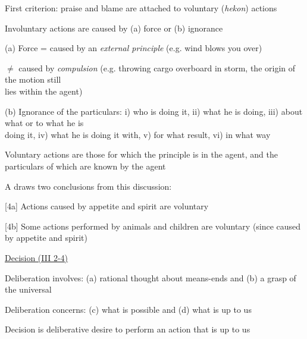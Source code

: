 \documentclass[11pt]{article}
\begin{document}
\noindent [1] First criterion: praise and blame are attached to voluntary (\emph{hekon}) actions
\vspace*{1mm}

\noindent [2] Involuntary actions are caused by (a) force or (b) ignorance
\vspace*{1mm}

(a) Force = caused by an \emph{external principle} (e.g. wind blows you over)
\vspace*{1mm}

\hspace*{14.5mm}$\neq$ caused by \emph{compulsion} (e.g. throwing cargo overboard in storm, the origin of the motion still\\\hspace*{23mm} lies within the agent)
\vspace*{1mm}

(b) Ignorance of the particulars: i) who is doing it, ii) what he is doing, iii) about what or to what he is\\\hspace*{10mm} doing it, iv) what he is doing it with, v) for what result, vi) in what way
\vspace*{1mm}
\vspace{1mm}

\noindent [3] Voluntary actions are those for which the principle is in the agent, and the particulars of which are known by the agent
\vspace*{1mm}

\noindent [4] A draws two conclusions from this discussion:
\vspace*{1mm}

[4a] Actions caused by appetite and spirit are voluntary
\vspace*{1mm}

[4b] Some actions performed by animals and children are voluntary (since caused by appetite and spirit)
\vspace*{3mm}

\noindent\underline{Decision (III 2-4)}
\vspace*{2mm}

\noindent [1] Deliberation involves: (a) rational thought about means-ends and (b) a grasp of the universal
\vspace*{1mm}

\noindent [2] Deliberation concerns: (c) what is possible and (d) what is up to us
\vspace*{1mm}

\noindent [3] Decision is deliberative desire to perform an action that is up to us
\vspace*{1mm}
\end{document}

